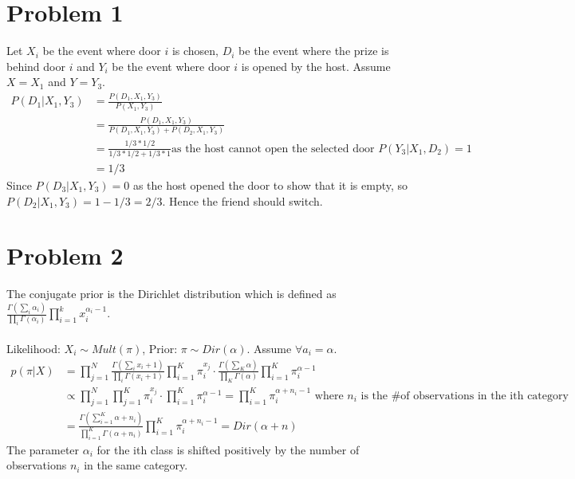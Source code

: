 \documentclass[twoside]{homework}
\begin{document}
\maketitle

\section*{Problem 1}
Let $X_i$ be the event where door $i$ is chosen, $D_i$ be the event where the prize is behind door $i$ and $Y_i$ be the event where door $i$ is opened by the host. Assume $X = X_1$ and $Y = Y_3$.
\begin{align*}
P(D_1 | X_1, Y_3) 
&= \frac{P(D_1, X_1, Y_3)}{P(X_1, Y_3)}\\
&= \frac{P(D_1, X_1, Y_3)}{P(D_1, X_1, Y_3) + P(D_2, X_1, Y_3)}\\
&= \frac{1/3 * 1/2}{1/3 * 1/2 + 1/3 * 1} \textrm{as the host cannot open the selected door $P(Y_3 | X_1, D_2) = 1$}\\
&= 1/3
\end{align*}
Since $P(D_3 | X_1, Y_3) = 0$ as the host opened the door to show that it is empty, so $P(D_2 | X_1, Y_3) =  1 - 1/3 = 2/3$. Hence the friend should switch.

\section*{Problem 2}
The conjugate prior is the Dirichlet distribution which is defined as $\frac{\Gamma\left(\sum_i \alpha_i\right)}{\prod_i \Gamma(\alpha_i)} \prod_{i=1}^k x_i^{\alpha_i-1}$.
\\ 
\\ Likelihood: $X_i \sim Mult(\pi)$, Prior: $\pi \sim Dir(\alpha)$. Assume $\forall a_i = \alpha$.
\begin{align*}
p(\pi | X)  
&= \prod_{j=1}^N \frac{\Gamma(\sum_i x_i + 1)}{\prod_i \Gamma(x_i + 1)} \prod_{i=1}^K \pi_i^{x_j} \cdot \frac{\Gamma\left(\sum_K \alpha\right)}{\prod_K \Gamma(\alpha)} \prod_{i=1}^K \pi_i^{\alpha-1}\\
&\propto \prod_{j=1}^N \prod_{j=1}^K \pi_i^{x_j} \cdot \prod_{i=1}^K \pi_i^{\alpha-1} = \prod_{i=1}^K \pi_i^{\alpha + n_i - 1} \textrm{ where $n_i$ is the \# of observations in the ith category}\\
&= \frac{\Gamma\left(\sum_{i = 1}^K \alpha + n_i \right)}{\prod_{i = 1}^K \Gamma(\alpha + n_i)} \prod_{i=1}^K \pi_i^{\alpha + n_i -1} = Dir(\alpha + n)
\end{align*}
The parameter $\alpha_i$ for the ith class is shifted positively by the number of observations $n_i$ in the same category.
\end{document}
